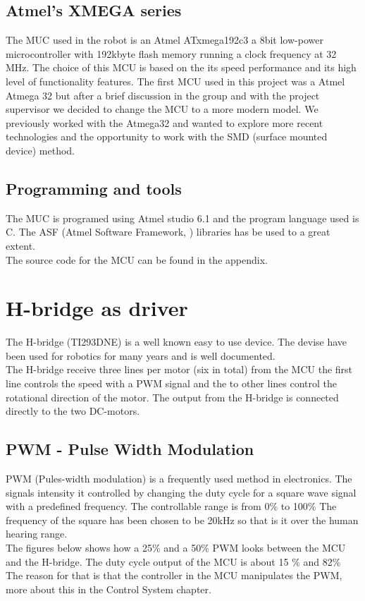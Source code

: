 \subsection{Atmel's XMEGA series}
The MUC used in the robot is an Atmel ATxmega192c3 a 8bit low-power microcontroller with 192kbyte flash memory running a clock frequency at 32 MHz. The choice of this MCU is based on the its speed performance and its high level of functionality features. The first MCU used in this project was a Atmel Atmega 32 but after a brief discussion in the group and with the project supervisor we decided to change the MCU to a more modern model. We previously worked with the Atmega32 and wanted to explore more recent technologies and the opportunity to work with the SMD (surface mounted device) method. 

\subsection{Programming and tools}
The MUC is programed using Atmel studio 6.1 and the program language used is C. The ASF (Atmel Software Framework, \citep{asf}) libraries has be used to a great extent.  \\
The source code for the MCU can be found in the appendix. 

\section{H-bridge as driver}
The H-bridge (TI293DNE) is a well known easy to use device. The devise have been used for robotics for many years and is well documented. \\  
The H-bridge receive three lines per motor (six in total) from the MCU the first line controls the speed with a PWM signal and the to other lines control the rotational direction of the motor. The output from the H-bridge is connected directly to the two DC-motors.

\subsection{PWM - Pulse Width Modulation}

PWM (Pules-width modulation) is a frequently used method in electronics. The signals intensity it controlled by changing the duty cycle for a square wave signal with a predefined frequency. The controllable range is from 0$\% $ to 100$\%$ 
The frequency of the square has been chosen to be 20kHz so that is it over the human hearing range. 
\\
The figures below shows how a 25$\%$ and a 50$\%$  PWM looks between the MCU and the H-bridge. The duty cycle output of the MCU is about 15 $\%$ and 82$\%$ The reason for that is that the controller in the MCU manipulates the PWM, more about this in the Control System chapter.

